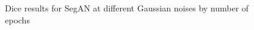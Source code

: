 \begin{figure}
    \centerline{}
    \caption{Dice results for SegAN at different Gaussian noises by number of epochs}
    \label{figure:all-noises-by-epoch-dice-segan}
\end{figure}

